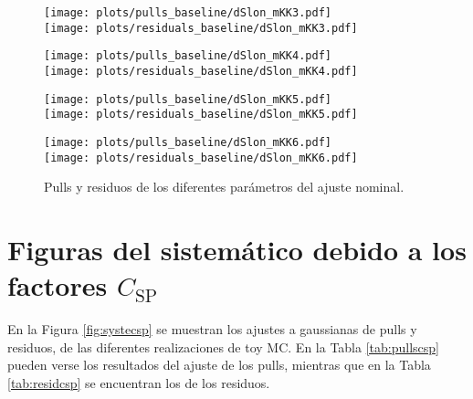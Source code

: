 \begin{subappendices}
\begin{figure}[H] 
  \centering
  \begin{multicols}{2}
  \texttt{[image: plots/pulls\_baseline/dSlon\_mKK3.pdf]}  \\
  \texttt{[image: plots/residuals\_baseline/dSlon\_mKK3.pdf]}
  \end{multicols}  
  \begin{multicols}{2}
  \texttt{[image: plots/pulls\_baseline/dSlon\_mKK4.pdf]}  \\
  \texttt{[image: plots/residuals\_baseline/dSlon\_mKK4.pdf]}
  \end{multicols}  
  \begin{multicols}{2}
  \texttt{[image: plots/pulls\_baseline/dSlon\_mKK5.pdf]}  \\
  \texttt{[image: plots/residuals\_baseline/dSlon\_mKK5.pdf]}
  \end{multicols}  
  \begin{multicols}{2}
  \texttt{[image: plots/pulls\_baseline/dSlon\_mKK6.pdf]}  \\
  \texttt{[image: plots/residuals\_baseline/dSlon\_mKK6.pdf]}
  \end{multicols}    
\caption{Pulls y residuos de los diferentes parámetros del ajuste nominal.}
\end{figure}





\section{Figuras del sistemático debido a los factores $C_{\text{SP}}$}

En la Figura \ref{fig:systecsp} se muestran los ajustes a gaussianas de pulls y residuos, de las diferentes realizaciones de toy MC. En la Tabla \ref{tab:pullscsp} pueden verse los resultados del ajuste de los pulls, mientras que en la Tabla \ref{tab:residcsp} se encuentran los de los residuos.



\end{subappendices}
